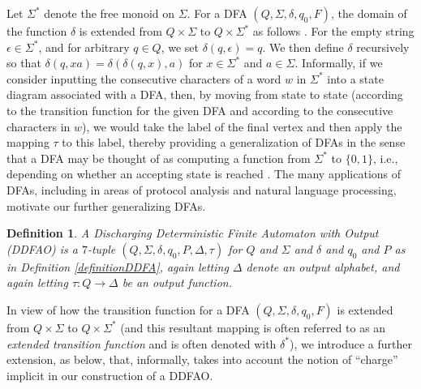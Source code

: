 \documentclass[12pt]{article}
\newtheorem{definition}{Definition}
\begin{document}
 Let $\Sigma^{\ast}$ denote the free monoid on $\Sigma$. For a DFA $(Q, \Sigma, \delta, q_0, F)$, the domain of the function 
 $\delta$ is extended from $Q \times \Sigma$ to $Q \times \Sigma^{\ast}$ as follows \cite[p.\ 129]{AlloucheShallit2003}. For the 
 empty string $\epsilon \in \Sigma^{\ast}$, and for arbitrary $q \in Q$, we set $\delta(q, \epsilon) = q$. We then define $\delta$ 
 recursively so that $\delta(q, xa) = \delta(\delta(q, x), a)$ for $x \in \Sigma^{\ast}$ and $a \in \Sigma$. Informally, if we consider 
 inputting the consecutive characters of a word $w$ in $\Sigma^{\ast}$ into a state diagram associated with a DFA, then, by moving 
 from state to state (according to the transition function for the given DFA and according to the consecutive characters in $w$), we 
 would take the label of the final vertex and then apply the mapping $\tau$ to this label, thereby providing a generalization of DFAs in 
 the sense that a DFA may be thought of as computing a function from $\Sigma^{\ast}$ to $\{ 0, 1 \}$, i.e., depending on whether an 
 accepting state is reached \cite[p.\ 139]{AlloucheShallit2003}. The many applications of DFAs, including in areas of protocol analysis 
 and natural language processing, motivate our further generalizing DFAs. 

\begin{definition}
 A \emph{Discharging Deterministic Finite Automaton with Output} (DDFAO) is a $7$-tuple 
 $(Q, \Sigma, \delta, q_0, P, \Delta, \tau)$ 
 for $Q$ and $\Sigma$ and $\delta$ and $q_0$ and $P$ as in Definition \ref{definitionDDFA}, 
 again letting $\Delta$ denote an output alphabet, 
 and again letting $\tau\colon Q \to \Delta$ 
 be an output function. 
\end{definition}

 In view of how the transition function for a DFA 
 $(Q, \Sigma, \delta, q_0, F)$ is extended from $Q \times \Sigma$ to $Q \times \Sigma^{\ast}$ 
 (and this resultant mapping is often referred to as an \emph{extended transition function} and is often denoted with $\delta^{\ast}$), 
 we introduce a further extension, as below, that, informally, takes into account the notion of ``charge'' 
 implicit in our construction of a DDFAO. 
\end{document}
